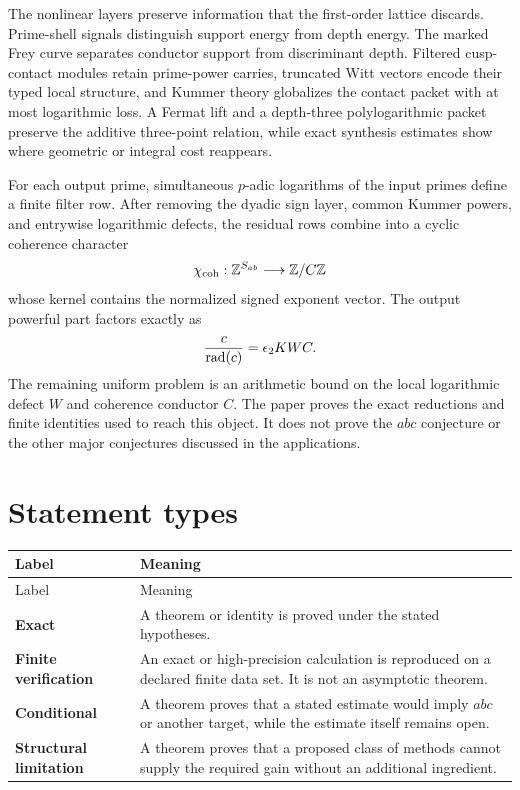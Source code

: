 The nonlinear layers preserve information that the first-order lattice discards. Prime-shell signals distinguish support energy from depth energy. The marked Frey curve separates conductor support from discriminant depth. Filtered cusp-contact modules retain prime-power carries, truncated Witt vectors encode their typed local structure, and Kummer theory globalizes the contact packet with at most logarithmic loss. A Fermat lift and a depth-three polylogarithmic packet preserve the additive three-point relation, while exact synthesis estimates show where geometric or integral cost reappears.

For each output prime, simultaneous $p$-adic logarithms of the input primes define a finite filter row. After removing the dyadic sign layer, common Kummer powers, and entrywise logarithmic defects, the residual rows combine into a cyclic coherence character
\[
 \chi_{\mathrm{coh}}:\mathbb Z^{S_{ab}}\longrightarrow\mathbb Z/C\mathbb Z
\]
whose kernel contains the normalized signed exponent vector. The output powerful part factors exactly as
\[
 \frac{c}{\operatorname{rad}(c)}=\epsilon_2KWC.
\]
The remaining uniform problem is an arithmetic bound on the local logarithmic defect $W$ and coherence conductor $C$. The paper proves the exact reductions and finite identities used to reach this object. It does not prove the $abc$ conjecture or the other major conjectures discussed in the applications.

\chapter*{Statement types}
\begin{longtable}{L{0.18\textwidth}L{0.72\textwidth}}
\toprule
Label & Meaning\\
\midrule
\endfirsthead
\toprule
Label & Meaning\\
\midrule
\endhead
\textbf{Exact} & A theorem or identity is proved under the stated hypotheses.\\
\textbf{Finite verification} & An exact or high-precision calculation is reproduced on a declared finite data set. It is not an asymptotic theorem.\\
\textbf{Conditional} & A theorem proves that a stated estimate would imply $abc$ or another target, while the estimate itself remains open.\\
\textbf{Structural limitation} & A theorem proves that a proposed class of methods cannot supply the required gain without an additional ingredient.\\
\bottomrule
\end{longtable}

